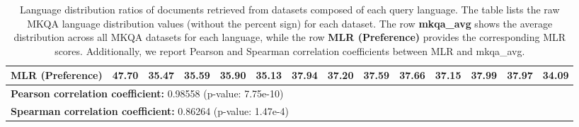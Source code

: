 \begin{table*}[t]
\begin{tabular}{lccccccccccccc}
\rowcolor{gray!20} \textbf{MLR (Preference)} & \textbf{47.70} & \textbf{35.47} & \textbf{35.59} & \textbf{35.90} & \textbf{35.13} & \textbf{37.94} & \textbf{37.20} & \textbf{37.59} & \textbf{37.66} & \textbf{37.15} & \textbf{37.99} & \textbf{37.97} & \textbf{34.09} \\
\midrule
\multicolumn{14}{l}{\textbf{Pearson correlation coefficient:} 0.98558 (p-value: 7.75e-10)} \\
\multicolumn{14}{l}{\textbf{Spearman correlation coefficient:} 0.86264 (p-value: 1.47e-4)} \\
\bottomrule
\end{tabular}
\caption{Language distribution ratios of documents retrieved from datasets composed of each query language. The table lists the raw MKQA language distribution values (without the percent sign) for each dataset. The row \textbf{mkqa\_avg} shows the average distribution across all MKQA datasets for each language, while the row \textbf{MLR (Preference)} provides the corresponding MLR scores. Additionally, we report Pearson and Spearman correlation coefficients between MLR and mkqa\_avg.}
\label{tab:analysis_mlr}
\end{table*}
